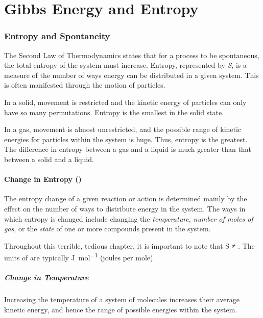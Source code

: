 
\pagebreak
\part{Gibbs Energy and Entropy}

	\section{Entropy and Spontaneity}

		The Second Law of Thermodynamics states that for a process to be spontaneous, the total entropy of the system must increase. Entropy, represented by \emph{S}, is a measure of the number of ways energy can be distributed in a given system. This is often manifested through
		the motion of particles.

		In a solid, movement is restricted and the kinetic energy of particles can only have so many permutations. Entropy is the smallest in the
		solid state.

		In a gas, movement is almost unrestricted, and the possible range of kinetic energies for particles within the system is huge. Thus,
		entropy is the greatest. The difference in entropy between a gas and a liquid is much greater than that between a solid and a liquid.


		\subsection{Change in Entropy (\entr{})}

			The entropy change of a given reaction or action is determined mainly by the effect on the number of ways to distribute energy in the
			system. The ways in which entropy is changed include changing the \emph{temperature}, \emph{number of moles of gas}, or the
			\emph{state} of one or more compounds present in the system.

			Throughout this terrible, tedious chapter, it is important to note that
			S ≠ \entr{}. The units of \entr{} are typically \si{\joule\per\mole} (joules per mole).

			\pagebreak
			\subsubsection{Change in Temperature}

				Increasing the temperature of a system of molecules increases their average kinetic energy, and hence the range of possible
				energies within the system.

